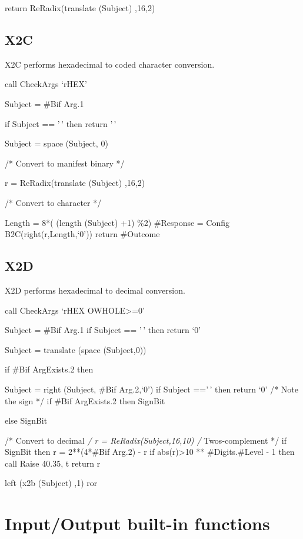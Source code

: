 return ReRadix(translate (Subject) ,16,2)

\subsection{X2C}\label{x2c}

X2C performs hexadecimal to coded character conversion.

call CheckArgs `rHEX'

Subject = \#Bif Arg.1

if Subject == '\,' then return '\,'

Subject = space (Subject, 0)

/* Convert to manifest binary */

r = ReRadix(translate (Subject) ,16,2)

/* Convert to character */

Length = 8*( (length (Subject) +1) \%2) \#Response = Config
B2C(right(r,Length,`0')) return \#Outcome

\subsection{X2D}\label{x2d}

X2D performs hexadecimal to decimal conversion.

call CheckArgs `rHEX OWHOLE\textgreater=0'

Subject = \#Bif Arg.1 if Subject == '\,' then return `0'

Subject = translate (space (Subject,0))

if \#Bif ArgExists.2 then

Subject = right (Subject, \#Bif Arg.2,`0') if Subject =='\,' then return
`0' /* Note the sign */ if \#Bif ArgExists.2 then SignBit

else SignBit

/* Convert to decimal \emph{/ r = ReRadix(Subject,16,10) /}
Twos-complement */ if SignBit then r = 2**(4*\#Bif Arg.2) - r if
abs(r)\textgreater10 ** \#Digits.\#Level - 1 then call Raise 40.35, t
return r

left (x2b (Subject) ,1) ror

\section{Input/Output built-in
functions}\label{inputoutput-built-in-functions}

